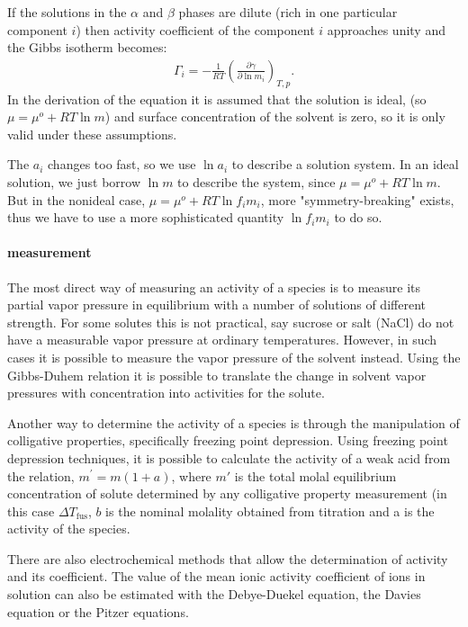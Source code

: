 If the solutions in the $\alpha$ and $\beta$ phases are dilute (rich in one particular component $i$) then activity coefficient 
of the component $i$ approaches unity and the Gibbs isotherm becomes:
\begin{eqnarray}
\Gamma_i = - \frac{1}{RT} \left( \frac{\partial \gamma}{\partial \ln m_i} \right)_{T,p}.
\label{6}
\end{eqnarray}
In the derivation of the equation it is assumed that the solution is ideal, (so $\mu = \mu^o + RT \ln m$) and surface concentration of the solvent is zero, so it is only valid under these assumptions.

The $a_i$ changes too fast, so we use $\ln a_i$ to describe a solution system. In an ideal solution, we just borrow $\ln m$ to describe the system, since $\mu = \mu^o + RT \ln m$. But in the nonideal case, $\mu = \mu^o + RT \ln f_im_i$, more "symmetry-breaking" exists, thus we have to use a more sophisticated quantity $\ln f_im_i$ to do so.

\paragraph{measurement}
The most direct way of measuring an activity of a species is {to measure its partial vapor pressure} in equilibrium 
with a number of solutions of different strength. For some solutes this is not practical, say sucrose or salt (NaCl) 
do not have a measurable vapor pressure at ordinary temperatures. However, in such cases it is possible to measure 
the vapor pressure of the solvent instead. Using the Gibbs-Duhem relation it is possible to translate the change in 
solvent vapor pressures with concentration into activities for the solute.

Another way to determine the activity of a species is through the manipulation of colligative properties, 
specifically freezing point depression. Using freezing point depression techniques, it is possible to calculate the activity of a weak acid from the relation,
$m^{\prime} = m(1 + a)$,
where $m'$ is the total molal equilibrium concentration of solute determined by any colligative property measurement 
(in this case $\Delta{T_\text{fus}}$, $b$ is the nominal molality obtained from titration and a is the activity of the species.

There are also electrochemical methods that allow the determination of activity and its coefficient.
The value of the mean ionic activity coefficient of ions in solution can also be estimated with the Debye-Duekel equation, the Davies equation or the Pitzer equations.
